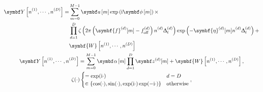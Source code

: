 \begin{subequations}
    \begin{gather}
        \begin{split}
            \bY\left[\none, \cdots, \nD\right] =
                &\sum_{m=0}^{M-1} \bdam \exp\left( \iu \bdphim \right) \times \\
                &\prod_{d=1}^D
                \zeta\left(2 \pi \left(\symbf{f}^{(d)}_{\vphantom{\text{off}}}[m]  - \foffd\right) \nd \Dtd\right)
                \exp\left(-\symbf{\eta}^{(d)}_{\vphantom{\text{off}}}[m] \nd \Dtd\right) +\\
                &\symbf{W}\left[n^{(1)}, \cdots, n^{(D)}\right]
        \end{split}\\
        \bY\left[\none, \cdots, \nD\right] =
            \sum_{m=0}^{M-1} \bdalpham
            \prod_{d=1}^D \bdzd[m] +
            \symbf{W}\left[n^{(1)}, \cdots, n^{(D)}\right], \\
        \zeta(\cdot)
        \begin{cases}
            = \exp(\iu\cdot) & d = D \\
            \in \left\lbrace \cos(\cdot), \sin(\cdot), \exp(\iu\cdot) \exp(-\iu\cdot)\right\rbrace & \text{otherwise}
        \end{cases},
    \end{gather}
    \label{eq:general fid}%
\end{subequations}%

